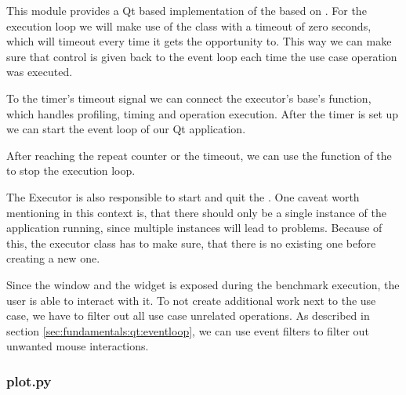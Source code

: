 This module provides a Qt based implementation of the
 based on
. For the execution loop we will make use of
the  class with a timeout of zero seconds,
which will timeout every time it gets the opportunity to. This way we can make
sure that control is given back to the event loop each time the use case
operation was executed.
\cite{QTimer}

To the timer's timeout signal we can connect the executor's base's
 function, which handles profiling, timing
and operation execution. After the timer is set up we can start the event loop
of our Qt application.



After reaching the repeat counter or the timeout, we can use the
 function of the 
to stop the execution loop.



The Executor is also responsible to start and quit the
. One caveat worth mentioning in this
context is, that there should only be a single instance of the application
running, since multiple  instances will lead to
problems. Because of this, the executor class has to make sure, that there is
no existing one before creating a new one.



Since the window and the widget is exposed during the benchmark execution, the
user is able to interact with it. To not create additional work next to the use
case, we have to filter out all use case unrelated operations. As described in
section \ref{sec:fundamentals:qt:eventloop}, we can use event filters to filter
out unwanted mouse interactions.



\subsubsection*{plot.py}

